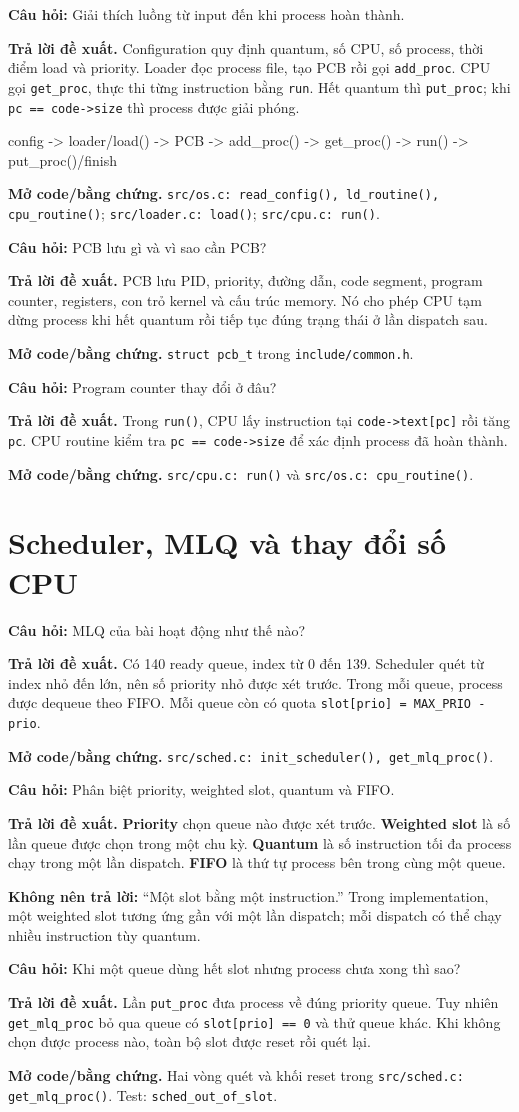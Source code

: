 \documentclass[11pt,a4paper]{article}
\newcommand{\code}[1]{\texttt{\color{navy}#1}}
\newcommand{\q}[1]{%
  \vspace{0.55em}\noindent
  \colorbox{pale}{\parbox{\dimexpr\textwidth-2\fboxsep}{\textbf{\color{navy}Câu hỏi:} #1}}%
  \par\vspace{0.3em}}
\newcommand{\ans}[1]{\textbf{\color{cyan}Trả lời đề xuất.} #1\par}
\newcommand{\proofcode}[1]{\textbf{\color{orange}Mở code/bằng chứng.} #1\par}
\newcommand{\danger}[1]{%
  \colorbox{palered}{\parbox{\dimexpr\textwidth-2\fboxsep}{\textbf{\color{red}Không nên trả lời:} #1}}\par}
\newcommand{\flow}[1]{%
  \begin{center}
  \colorbox{pale}{\parbox{0.94\textwidth}{\centering\ttfamily\color{navy}#1}}
  \end{center}}
\begin{document}
\q{Giải thích luồng từ input đến khi process hoàn thành.}
\ans{Configuration quy định quantum, số CPU, số process, thời điểm load và
priority. Loader đọc process file, tạo PCB rồi gọi \code{add\_proc}. CPU gọi
\code{get\_proc}, thực thi từng instruction bằng \code{run}. Hết quantum thì
\code{put\_proc}; khi \code{pc == code->size} thì process được giải phóng.}
\flow{config -> loader/load() -> PCB -> add\_proc() -> get\_proc() -> run() -> put\_proc()/finish}
\proofcode{\code{src/os.c: read\_config(), ld\_routine(), cpu\_routine()};
\code{src/loader.c: load()}; \code{src/cpu.c: run()}.}

\q{PCB lưu gì và vì sao cần PCB?}
\ans{PCB lưu PID, priority, đường dẫn, code segment, program counter, registers,
con trỏ kernel và cấu trúc memory. Nó cho phép CPU tạm dừng process khi hết
quantum rồi tiếp tục đúng trạng thái ở lần dispatch sau.}
\proofcode{\code{struct pcb\_t} trong \code{include/common.h}.}

\q{Program counter thay đổi ở đâu?}
\ans{Trong \code{run()}, CPU lấy instruction tại \code{code->text[pc]} rồi tăng
\code{pc}. CPU routine kiểm tra \code{pc == code->size} để xác định process đã
hoàn thành.}
\proofcode{\code{src/cpu.c: run()} và \code{src/os.c: cpu\_routine()}.}

\section{Scheduler, MLQ và thay đổi số CPU}

\q{MLQ của bài hoạt động như thế nào?}
\ans{Có 140 ready queue, index từ 0 đến 139. Scheduler quét từ index nhỏ đến
lớn, nên số priority nhỏ được xét trước. Trong mỗi queue, process được dequeue
theo FIFO. Mỗi queue còn có quota \code{slot[prio] = MAX\_PRIO - prio}.}
\proofcode{\code{src/sched.c: init\_scheduler(), get\_mlq\_proc()}.}

\q{Phân biệt priority, weighted slot, quantum và FIFO.}
\ans{\textbf{Priority} chọn queue nào được xét trước. \textbf{Weighted slot} là
số lần queue được chọn trong một chu kỳ. \textbf{Quantum} là số instruction tối
đa process chạy trong một lần dispatch. \textbf{FIFO} là thứ tự process bên
trong cùng một queue.}
\danger{``Một slot bằng một instruction.'' Trong implementation, một weighted
slot tương ứng gần với một lần dispatch; mỗi dispatch có thể chạy nhiều
instruction tùy quantum.}

\q{Khi một queue dùng hết slot nhưng process chưa xong thì sao?}
\ans{Lần \code{put\_proc} đưa process về đúng priority queue. Tuy nhiên
\code{get\_mlq\_proc} bỏ qua queue có \code{slot[prio] == 0} và thử queue khác.
Khi không chọn được process nào, toàn bộ slot được reset rồi quét lại.}
\proofcode{Hai vòng quét và khối reset trong \code{src/sched.c:
get\_mlq\_proc()}. Test: \code{sched\_out\_of\_slot}.}
\end{document}
